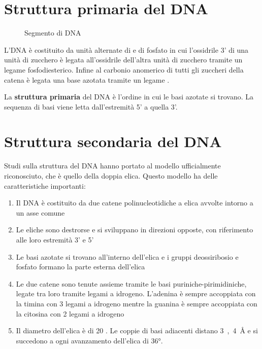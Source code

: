 \section{Struttura primaria del DNA}
\begin{wrapfigure}[10]{l}{0.4\textwidth}
	\centering
	\vspace{-20pt}
	\caption{Segmento di DNA}
	\vspace{-10pt}
\end{wrapfigure}
L'\acl{DNA} è costituito da unità alternate di  e di fosfato in cui l'ossidrile 3' di una unità di zucchero è legata all'ossidrile dell'altra unità di zucchero tramite un legame fosfodiesterico. Infine al carbonio anomerico di tutti gli zuccheri della catena è legata una base azotata tramite un legame .

La \textbf{struttura primaria} del DNA è l'ordine in cui le basi azotate si trovano. La sequenza di basi viene letta dall'estremità 5' a quella 3'.


\section{Struttura secondaria del DNA}
Studi sulla struttura del \ac{DNA} hanno portato al modello ufficialmente riconosciuto, che è quello della doppia elica. Questo modello ha delle caratteristiche importanti:
\begin{enumerate}
	\item Il \ac{DNA} è costituito da due catene polinucleotidiche a elica avvolte intorno a un asse comune
	\item Le eliche sono destrorse e si sviluppano in direzioni opposte, con riferimento alle loro estremità 3' e 5'
	\item Le basi azotate si trovano all'interno dell'elica e i gruppi deossiribosio e fosfato formano la parte esterna dell'elica
	\item Le due catene sono tenute assieme tramite le basi puriniche-pirimidiniche, legate tra loro tramite legami a idrogeno. L'adenina è sempre accoppiata con la timina con 3 legami a idrogeno mentre la guanina è sempre accoppiata con la citosina con 2 legami a idrogeno
	\item Il diametro dell'elica è di 20 \angstrom. Le coppie di basi adiacenti distano \unit{3,4 \angstrom} e si succedono a ogni avanzamento dell'elica di \ang{36}.
\end{enumerate}

